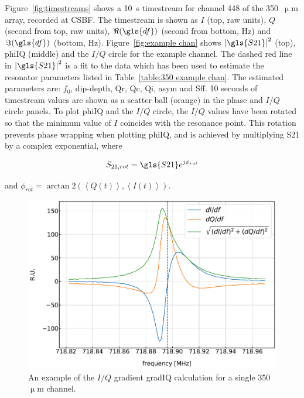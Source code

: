 Figure~\ref{fig:timestreams} shows a 10~s timestream for channel 448 of the 350~$\upmu$m array, recorded at CSBF\@. The timestream is shown as $I$ (top, raw units), $Q$ (second from top, raw units), $\Re(\gls{df})$ (second from bottom, Hz) and $\Im(\gls{df})$ (bottom, Hz). Figure~\ref{fig:example chan} shows $\left| \gls{S21} \right|^{2}$ (top), \gls{phiIQ} (middle) and the $I/Q$ circle for the example channel. The dashed red line in $\left| \gls{S21} \right|^{2}$ is a fit to the data which has been used to estimate the resonator parameters listed in Table~\ref{table:350 example chan}. The estimated parameters are: $f_{0}$, dip-depth, \gls{Qr}, \gls{Qc}, \gls{Qi}, \gls{asym} and \gls{Sff}. 10 seconds of timestream values are shown as a scatter ball (orange) in the phase and $I/Q$ circle panels. To plot \gls{phiIQ} and the $I/Q$ circle, the $I/Q$ values have been rotated so that the minimum value of $I$ coincides with the resonance point. This rotation prevents phase wrapping when plotting \gls{phiIQ}, and is achieved by multiplying \gls{S21} by a complex exponential, where

\begin{equation}
  S_{21,rot} = \gls{S21} e^{j\phi_{rot}}
\end{equation}

and $\phi_{rot} = \arctan2(\left< Q(t) \right>, \left< I(t) \right>)$.

\begin{figure}[!htbp]
\centering
\includegraphics[width=\textwidth]{figures/blast_data/timestreams/350_pal_IQgradExample_448}
\caption[~ for a single 350~ channel.]{An example of the $I/Q$ gradient \gls{gradIQ} calculation for a single 350~$\upmu$m channel.}
\label{fig:IQ grad}
\end{figure}


